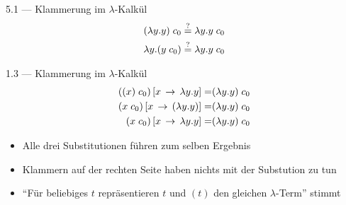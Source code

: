 \documentclass{beamer}
\begin{document}
\setcounter{equation}{0}

\begin{frame}{5.1 --- Klammerung im $\lambda$-Kalkül}
	\begin{eqnarray}
		(\lambda{}y.y)\;{}c_0 \stackrel{?}{=} \lambda{}y.y\;{}c_0 \\
		\lambda{}y.(y\;{}c_0) \stackrel{?}{=} \lambda{}y.y\;{}c_0
	\end{eqnarray}


\end{frame}

\setcounter{equation}{0}

\begin{frame}{1.3 --- Klammerung im $\lambda$-Kalkül}
	\begin{eqnarray}
		((x)\;{}c_0)\left[x\,\to\,\lambda{}y.y\right] =& (\lambda{}y.y)\;{}c_0 \\
		(x\;{}c_0)\left[x\,\to\,(\lambda{}y.y)\right] =& (\lambda{}y.y)\;{}c_0 \\
		(x\;{}c_0)\left[x\,\to\,\lambda{}y.y\right] =& (\lambda{}y.y)\;{}c_0
	\end{eqnarray}

	\begin{itemize}
		\item Alle drei Substitutionen führen zum selben Ergebnis
		\item Klammern auf der rechten Seite haben nichts mit der Substution zu tun
		\item \enquote{Für beliebiges $t$ repräsentieren $t$ und $(t)$ den gleichen $\lambda$-Term} stimmt
	\end{itemize}
\end{frame}
\end{document}
